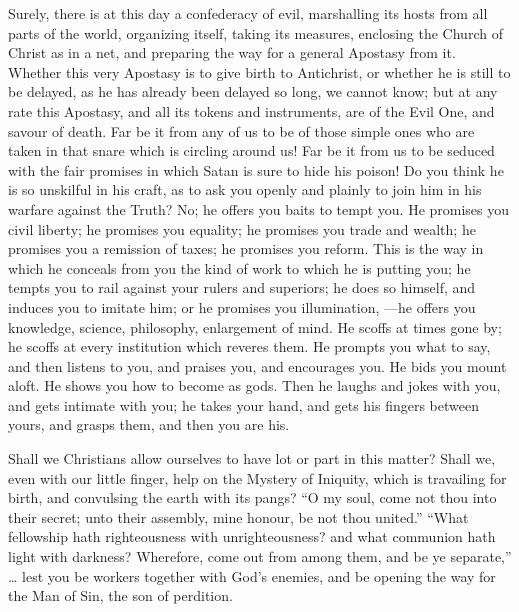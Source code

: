 Surely, there is at this day a confederacy of evil, marshalling its
hosts from all parts of the world, organizing itself, taking its
measures, enclosing the Church of Christ as in a net, and preparing
the way for a general Apostasy from it. Whether this very Apostasy is
to give birth to Antichrist, or whether he is still to be delayed, as
he has already been delayed so long, we cannot know; but at any rate
this Apostasy, and all its tokens and instruments, are of the Evil
One, and savour of death. Far be it from any of us to be of those
simple ones who are taken in that snare which is circling around us!
Far be it from us to be seduced with the fair promises in which Satan
is sure to hide his poison! Do you think he is so unskilful in his
craft, as to ask you openly and plainly to join him in his warfare
against the Truth? No; he offers you baits to tempt you. He promises
you civil liberty; he promises you equality; he promises you trade and
wealth; he promises you a remission of taxes; he promises you reform.
This is the way in which he conceals from you the kind of work to
which he is putting you; he tempts you to rail against your rulers and
superiors; he does so himself, and induces you to imitate him; or he
promises you illumination, —he offers you knowledge, science,
philosophy, enlargement of mind. He scoffs at times gone by; he scoffs
at every institution which reveres them. He prompts you what to say,
and then listens to you, and praises you, and encourages you. He bids
you mount aloft. He shows you how to become as gods. Then he laughs
and jokes with you, and gets intimate with you; he takes your hand,
and gets his fingers between yours, and grasps them, and then you are
his.

Shall we Christians allow ourselves to have lot or part in this
matter? Shall we, even with our little finger, help on the Mystery of
Iniquity, which is travailing for birth, and convulsing the earth with
its pangs? ``O my soul, come not thou into their secret; unto
their assembly, mine honour, be not thou united.'' ``What
fellowship hath righteousness with unrighteousness? and what communion
hath light with darkness? Wherefore, come out from among them, and be
ye separate,'' … lest you be workers together with God's
enemies, and be opening the way for the Man of Sin, the son of
perdition.


